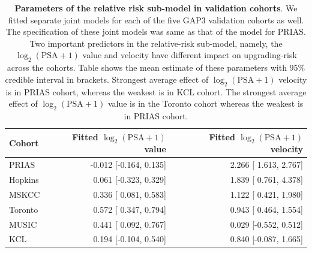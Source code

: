 \begin{table}
\small\sf\centering
\caption{\textbf{Parameters of the relative risk sub-model in validation cohorts}. We fitted separate joint models for each of the five GAP3 validation cohorts as well. The specification of these joint models was same as that of the model for PRIAS. Two important predictors in the relative-risk sub-model, namely, the $\log_2 (\mbox{PSA} + 1)$ value and velocity have different impact on upgrading-risk across the cohorts. Table shows the mean estimate of these parameters with 95\% credible interval in brackets. Strongest average effect of $\log_2 (\mbox{PSA} + 1)$ velocity is in PRIAS cohort, whereas the weakest is in KCL cohort. The strongest average effect of $\log_2 (\mbox{PSA} + 1)$ value is in the Toronto cohort whereas the weakest is in PRIAS cohort.}
\label{tab:PSA_survival_gap3}
\begin{tabular}{lrr}
\hline
Cohort & Fitted $\log_2 (\mbox{PSA} + 1)$ value & Fitted $\log_2 (\mbox{PSA} + 1)$ velocity\\
\hline
PRIAS & -0.012 [-0.164, 0.135] & 2.266 [ 1.613, 2.767]\\
Hopkins & 0.061 [-0.323, 0.329] & 1.839 [ 0.761, 4.378]\\
MSKCC & 0.336 [ 0.081, 0.583] & 1.122 [ 0.421, 1.980]\\
Toronto & 0.572 [ 0.347, 0.794] & 0.943 [ 0.464, 1.554]\\
MUSIC & 0.441 [ 0.092, 0.767] & 0.029 [-0.552, 0.512]\\
KCL &  0.194 [-0.104, 0.540] & 0.840 [-0.087, 1.665]\\
\hline
\end{tabular}
\end{table}

